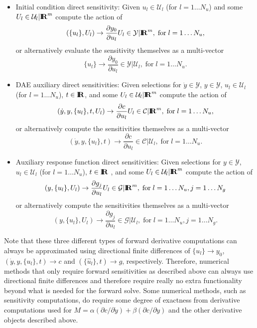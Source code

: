 \documentclass[pdf,ps2pdf,11pt]{SANDreport}
\begin{document}
\begin{itemize}

{}\item Initial condition direct sensitivity: Given $u_l\in\mathcal{U}_l$ (for
$l=1\ldots{}N_u$) and some $U_l\in\mathcal{U}_l|\mbox{\textbf{I}}\hspace{-0.6ex}\mbox{\textbf{R}}^m$ compute the action of
\[
(\{u_l\},U_l) {}\rightarrow \frac{\partial y_0}{\partial u_l} U_l \in \mathcal{Y}|\mbox{\textbf{I}}\hspace{-0.6ex}\mbox{\textbf{R}}^m,
\; \mbox{for} \; l = 1 {}\ldots N_u,
\]
or alternatively evaluate the sensitivity themselves as a multi-vector
\[
\{u_l\} {}\rightarrow \frac{\partial y_0}{\partial u_l} \in \mathcal{Y}|\mathcal{U}_l,
\; \mbox{for} \; l = 1 {}\ldots N_u.
\]

{}\item DAE auxiliary direct sensitivities: Given selections for
$\dot{y}\in\mathcal{Y}$, $y\in\mathcal{Y}$, $u_l\in\mathcal{U}_l$ (for
$l=1\ldots{}N_u$), $t\in\mbox{\textbf{I}}\hspace{-0.6ex}\mbox{\textbf{R}}$, and some $U_l\in\mathcal{U}_l|\mbox{\textbf{I}}\hspace{-0.6ex}\mbox{\textbf{R}}^m$ compute
the action of
\[
(\dot{y},y,\{u_l\},t,U_l) {}\rightarrow \frac{\partial c}{\partial u_l} U_l \in \mathcal{C}|\mbox{\textbf{I}}\hspace{-0.6ex}\mbox{\textbf{R}}^m,
\; \mbox{for} \; l = 1 {}\ldots N_u,
\]
or alternatively compute the sensitivities themselves as a multi-vector
\[
(\dot{y},y,\{u_l\},t) {}\rightarrow \frac{\partial c}{\partial u_l} \in \mathcal{C}|\mathcal{U}_l,
\; \mbox{for} \; l = 1 {}\ldots N_u.
\]

{}\item Auxiliary response function direct sensitivities: Given selections for
$y\in\mathcal{Y}$, $u_l\in\mathcal{U}_l$ (for $l=1\ldots{}N_u$), $t\in\mbox{\textbf{I}}\hspace{-0.6ex}\mbox{\textbf{R}}$ ,
and some $U_l\in\mathcal{U}_l|\mbox{\textbf{I}}\hspace{-0.6ex}\mbox{\textbf{R}}^m$ compute the action of
\[
(y,\{u_l\},U_l) {}\rightarrow \frac{\partial g_j}{\partial u_l} U_l \in \mathcal{G}|\mbox{\textbf{I}}\hspace{-0.6ex}\mbox{\textbf{R}}^m,
\; \mbox{for} \; l = 1 {}\ldots N_u, j = 1 \ldots N_g
\]
or alternatively compute the sensitivities themselves as a multi-vector
\[
(y,\{u_l\},U_l) {}\rightarrow \frac{\partial g_j}{\partial u_l} \in \mathcal{G}|\mathcal{U}_l,
\; \mbox{for} \; l = 1 {}\ldots N_u, j = 1 \ldots N_g.
\]

\end{itemize}

Note that these three different types of forward derivative computations can
always be approximated using directional finite differences of $\{u_l\}
{}\rightarrow y_0$, $(\dot{y},y,\{u_l\},t) {}\rightarrow c$ and
$(\{\hat{u}_l\},t) {}\rightarrow g$, respectively.  Therefore, numerical
methods that only require forward sensitivities as described above can always
use directional finite differences and therefore require really no extra
functionality beyond what is needed for the forward solve.  Some numerical
methods, such as sensitivity computations, do require some degree of exactness
from derivative computations used for $M = {}\alpha ({}\partial c / {}\partial
{}\dot{y}) + {}\beta ({}\partial c / {}\partial y)$ and the other derivative
objects described above.
\end{document}
